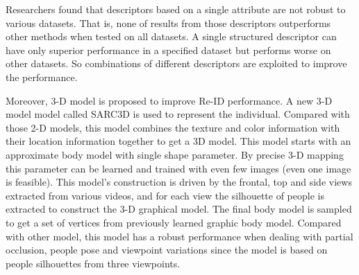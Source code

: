 Researchers found that descriptors based on a single attribute are not robust to various datasets. That is, none of results from those descriptors outperforms other methods when tested on all datasets. A single structured descriptor can have only superior performance in a specified dataset but performs worse on other datasets. So combinations of different descriptors are exploited to improve the performance. 

Moreover, 3-D model is proposed to improve Re-ID performance. A new 3-D model model called SARC3D \cite{SARC3D} is used to represent the individual. Compared with those 2-D models, this model combines the texture and color information with their location information together to get a 3D model. This model starts with an approximate body model with single shape parameter. By precise 3-D mapping this parameter can be learned and trained with even few images (even one image is feasible). This model's construction is driven by the frontal, top and side views extracted from various videos, and for each view the silhouette of people is extracted to construct the 3-D graphical model. The final body model is sampled to get a set of vertices from previously learned graphic body model. Compared with other model, this model has a robust performance when dealing with partial occlusion, people pose and viewpoint variations since the model is based on people silhouettes from three viewpoints.

